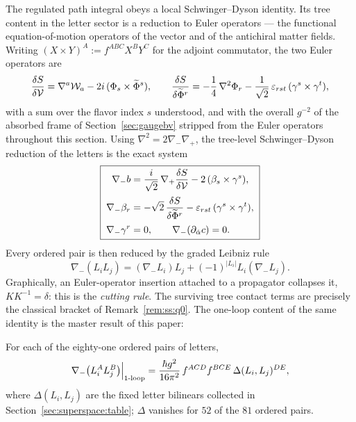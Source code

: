 The regulated path integral obeys a local Schwinger--Dyson identity. Its tree
content in the letter sector is a reduction to Euler operators --- the
functional equation-of-motion operators of the vector and of the antichiral
matter fields. Writing $(X\times Y)^A := f^{ABC}X^BY^C$ for the adjoint
commutator, the two Euler operators are
\begin{equation}\label{eq:ss:euler}
\frac{\delta S}{\delta\mathcal{V}}
=\nabla^{a}\mathcal{W}_{a}-2i\,(\Phi_{s}\times\widetilde\Phi^{s}),
\qquad
\frac{\delta S}{\delta\widetilde\Phi^{r}}
=-\frac14\,\nabla^{2}\Phi_{r}
-\frac{1}{\sqrt2}\,\varepsilon_{rst}\,(\gamma^{s}\times\gamma^{t}),
\end{equation}
with a sum over the flavor index $s$ understood, and with the overall
$g^{-2}$ of the absorbed frame of Section~\ref{sec:gaugebv} stripped from the
Euler operators throughout this section. Using
$\nabla^{2}=2\nabla_{-}\nabla_{+}$, the tree-level Schwinger--Dyson reduction
of the letters is the exact system
\begin{equation}\label{eq:ss:treeduction}
\boxed{\;
\begin{aligned}
\nabla_{-}b
&=\frac{i}{\sqrt2}\,\nabla_{+}\frac{\delta S}{\delta\mathcal{V}}
-2\,(\beta_{s}\times\gamma^{s}),\\[2pt]
\nabla_{-}\beta_{r}
&=-\sqrt2\,\frac{\delta S}{\delta\widetilde\Phi^{r}}
-\varepsilon_{rst}\,(\gamma^{s}\times\gamma^{t}),\\[2pt]
\nabla_{-}\gamma^{r}&=0,
\qquad
\nabla_{-}(\partial_{\dot\alpha}c)=0 .
\end{aligned}\;}
\end{equation}
Every ordered pair is then reduced by the graded Leibniz rule
\begin{equation}\label{eq:ss:leibniz}
\nabla_{-}(L_iL_j)
=(\nabla_{-}L_i)L_j+(-1)^{|L_i|}L_i(\nabla_{-}L_j) .
\end{equation}
Graphically, an Euler-operator insertion attached to a propagator collapses
it, $K K^{-1}=\delta$: this is the \emph{cutting rule}. The surviving tree
contact terms are precisely the classical bracket of
Remark~\ref{rem:ss:q0}. The one-loop content of the same identity is the
master result of this paper:

\begin{proposition}\label{prop:ss:master}
For each of the eighty-one ordered pairs of letters,
\begin{equation}\label{eq:ss:master}
\nabla_{-}\big(L_i^{A}L_j^{B}\big)\Big|_{\mathrm{1\text{-}loop}}
=\frac{\hbar g^{2}}{16\pi^{2}}\,f^{ACD}f^{BCE}\,\Delta(L_i,L_j)^{DE},
\end{equation}
where $\Delta(L_i,L_j)$ are the fixed letter bilinears collected in
Section~\ref{sec:superspace:table}; $\Delta$ vanishes for $52$ of the $81$
ordered pairs.
\end{proposition}

